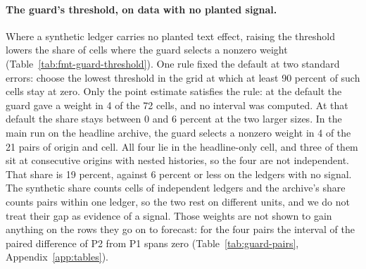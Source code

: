 \paragraph{The guard's threshold, on data with no planted signal.}
Where a synthetic ledger carries no planted text effect, raising the threshold lowers the share of cells where the guard selects a nonzero weight (Table~\ref{tab:fmt-guard-threshold}).
One rule fixed the default at two standard errors: choose the lowest threshold in the grid at which at least 90 percent of such cells stay at zero. Only the point estimate satisfies the rule: at the default the guard gave a weight in 4 of the 72 cells, and no interval was computed.
At that default the share stays between 0 and 6 percent at the two larger sizes.
In the main run on the headline archive, the guard selects a nonzero weight in 4 of the 21 pairs of origin and cell. All four lie in the headline-only cell, and three of them sit at consecutive origins with nested histories, so the four are not independent.
That share is 19 percent, against 6 percent or less on the ledgers with no signal. The synthetic share counts cells of independent ledgers and the archive's share counts pairs within one ledger, so the two rest on different units, and we do not treat their gap as evidence of a signal.
Those weights are not shown to gain anything on the rows they go on to forecast: for the four pairs the interval of the paired difference of P2 from P1 spans zero (Table~\ref{tab:guard-pairs}, Appendix~\ref{app:tables}).

